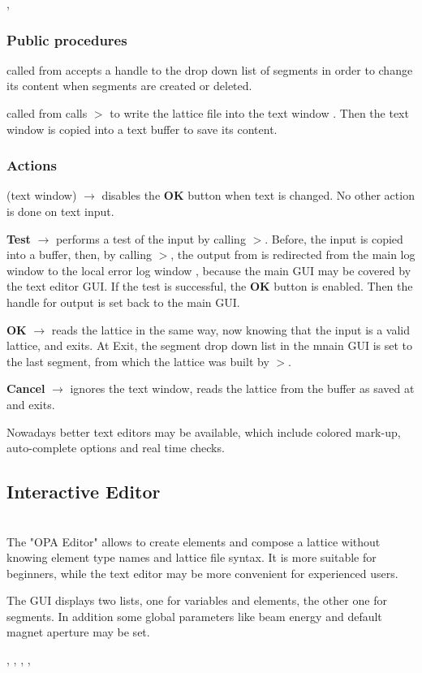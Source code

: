 \documentclass[12pt]{article}
\newcommand\code[1]{{\tt #1}}
\newcommand{\ofld}[1]{\colorbox{black!15}{{\bf #1}}}
\newcommand{\ofldx}[1]{\colorbox{black!15}{(#1)}}
\newcommand\guico[1]{{\color{blue}\code{#1}}}
\newcommand{\unico}[1]{{\color{burntorange}\code{#1}}}
\newcommand{\evcod}[2]{\ofld{#1} $\rightarrow$ \guico{#2}}
\newcommand{\evcodx}[2]{\ofldx{#1} $\rightarrow$ \guico{#2}}
\newcommand{\prcod}[2]{\opauni{#1}$>$\unico{#2}}
\newcommand{\opagui}[1]{\colorbox{blue!20}{{\color{black}\code{#1}}}}
\newcommand{\oguih}[2]{\subsection{\label{#2}#1}{\Huge\opagui{#2}}\\}
\newcommand{\ogui}[1]{\hyperref[#1]{\opagui{#1}}}
\newcommand{\opauni}[1]{\colorbox{orange!30}{{\color{black}\code{#1}}}}
\newcommand{\ouni}[1]{\hyperref[#1]{\opauni{#1}}}
\newcommand{\uses}[1]{\flushleft {\bf Uses:} #1}
\newcommand{\act}[1]{\subsubsection*{Actions} #1}
\newcommand{\ppro}[1]{\subsubsection*{Public procedures} #1}
\newcommand{\todo}[1]{{\color{red} #1}}
\begin{document}
\uses{\ouni{globlib}, \ouni{latfilelib}}

\ppro{
\guico{Init} called from \ogui{opamenu} accepts a handle to the drop down list of segments in order to change its content when segments are created or deleted.

\guico{LoadLattice} called from \ogui{opamenu} calls \prcod{latfilelib}{WriteLattice} to write the lattice file into the text window \guico{EdtWin}. Then the text window is copied into a text buffer to save its content.
}

\act{
\evcodx{text window}{disableOKBut} disables the \ofld{OK} button when text is changed. No other action is done on text input.

\evcod{Test}{filetest} performs a test of the input by calling \prcod{latfilelib}{LatRead}. Before, the input is copied into a buffer, then, by calling \prcod{globlib}{PassErrLogHandle}, the output from \unico{LatRead} is redirected from the \ogui{opamenu} main log window to the local error log window \guico{myerrlog}, because the main GUI may be covered by the text editor GUI. If the test is successful, the \ofld{OK} button is enabled. Then the handle for output is set back to the main GUI.


\evcod{OK}{fileget} reads the lattice in the same way, now knowing that the input is a valid lattice, and exits. At Exit, the segment drop down list in the mnain GUI is set to the last segment, from which the lattice was built by \prcod{latfilelib}{LatRead}.

\evcod{Cancel}{fileRestore} ignores the text window, reads the lattice from the buffer as saved at \guico{Init} and exits.

}

\todo{Nowadays better text editors may be available, which include colored mark-up, auto-complete options and real time checks.}

\oguih{Interactive Editor}{opaeditor}

The "OPA Editor" allows to create elements and compose a lattice without knowing element type names and lattice file syntax. It is more suitable for beginners, while the text editor may be more convenient for experienced users.

The GUI displays two lists, one for variables and elements, the other one for segments. In addition some global parameters like beam energy and default magnet aperture may be set.

\uses{\ouni{globlib}, \ogui{oelecreate}, \ogui{oeleedit}, \ogui{osegedit}, \ouni{../com/asaux}}
\end{document}
